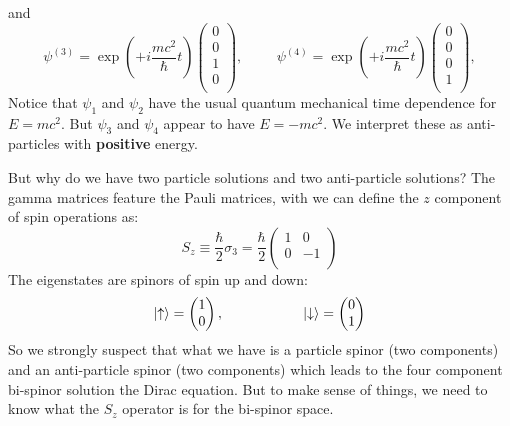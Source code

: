 \documentclass[12pt]{book}
\begin{document}
and
$$
\psi^{(3)} = \exp\left(+ i \frac{mc^2}{\hbar} t\right)
\begin{pmatrix} 
0\\
0\\
1\\
0\\
\end{pmatrix},
\hspace{1cm}
\psi^{(4)} = \exp\left(+ i \frac{mc^2}{\hbar} t\right)
\begin{pmatrix} 
0\\
0\\
0\\
1\\
\end{pmatrix},
$$
Notice that $\psi_1$ and $\psi_2$ have the usual quantum mechanical time dependence for $E=mc^2$.  But $\psi_3$ and $\psi_4$ appear to have $E=-mc^2$.  We interpret these as anti-particles with {\bf positive} energy.

But why do we have two particle solutions and two anti-particle solutions?  The gamma matrices feature the Pauli matrices, with we can define the $z$ component of spin operations as:
$$S_z \equiv \frac{\hbar}{2} \sigma_3 = \frac{\hbar}{2} \begin{pmatrix}
1 & 0 \\
0 & -1 \\
\end{pmatrix}
$$
The eigenstates are spinors of spin up and down:
$$\ket{\uparrow} = \begin{pmatrix} 1 \\ 0 \\ \end{pmatrix},
\hspace{2cm}
\ket{\downarrow} = \begin{pmatrix} 0 \\ 1 \\ \end{pmatrix}
$$
So we strongly suspect that what we have is a particle spinor (two components) and an anti-particle spinor (two components) which leads to the four component bi-spinor solution the Dirac equation.  But to make sense of things, we need to know what the $S_z$ operator is for the bi-spinor space.
\end{document}
